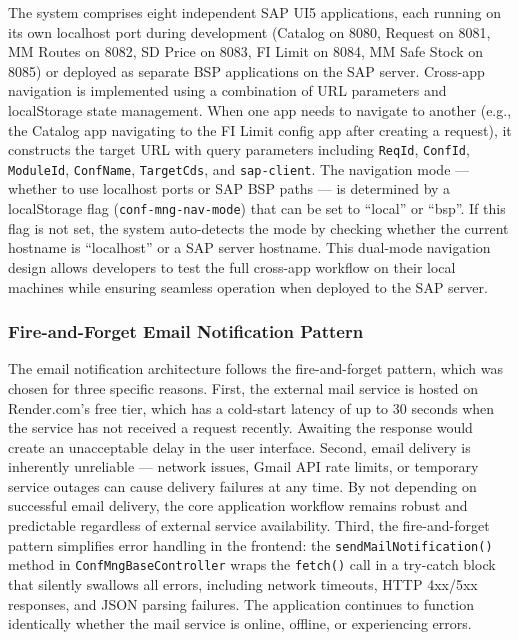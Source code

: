 \documentclass[12pt,a4paper]{report}
\begin{document}
The system comprises eight independent SAP UI5 applications, each running on its own localhost port during development (Catalog on 8080, Request on 8081, MM Routes on 8082, SD Price on 8083, FI Limit on 8084, MM Safe Stock on 8085) or deployed as separate BSP applications on the SAP server. Cross-app navigation is implemented using a combination of URL parameters and localStorage state management. When one app needs to navigate to another (e.g., the Catalog app navigating to the FI Limit config app after creating a request), it constructs the target URL with query parameters including \texttt{ReqId}, \texttt{ConfId}, \texttt{ModuleId}, \texttt{ConfName}, \texttt{TargetCds}, and \texttt{sap-client}. The navigation mode --- whether to use localhost ports or SAP BSP paths --- is determined by a localStorage flag (\texttt{conf-mng-nav-mode}) that can be set to ``local'' or ``bsp''. If this flag is not set, the system auto-detects the mode by checking whether the current hostname is ``localhost'' or a SAP server hostname. This dual-mode navigation design allows developers to test the full cross-app workflow on their local machines while ensuring seamless operation when deployed to the SAP server.

\subsubsection{Fire-and-Forget Email Notification Pattern}

The email notification architecture follows the fire-and-forget pattern, which was chosen for three specific reasons. First, the external mail service is hosted on Render.com's free tier, which has a cold-start latency of up to 30 seconds when the service has not received a request recently. Awaiting the response would create an unacceptable delay in the user interface. Second, email delivery is inherently unreliable --- network issues, Gmail API rate limits, or temporary service outages can cause delivery failures at any time. By not depending on successful email delivery, the core application workflow remains robust and predictable regardless of external service availability. Third, the fire-and-forget pattern simplifies error handling in the frontend: the \texttt{sendMailNotification()} method in \texttt{ConfMngBaseController} wraps the \texttt{fetch()} call in a try-catch block that silently swallows all errors, including network timeouts, HTTP 4xx/5xx responses, and JSON parsing failures. The application continues to function identically whether the mail service is online, offline, or experiencing errors.
\end{document}
